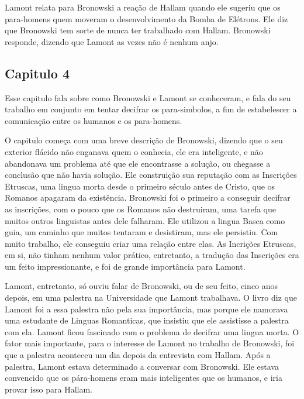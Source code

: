 \documentclass[14pt,portuguese]{extreport}
\begin{document}
	  Lamont relata para Bronowski a reação de Hallam quando ele sugeriu que os para-homens quem 
	  moveram o desenvolvimento da Bomba de Elétrons. Ele diz que Bronowski tem sorte de nunca ter 
	  trabalhado com Hallam. Bronowski responde, dizendo que Lamont as vezes não é nenhum anjo.


	\subsection{Capitulo 4}

	  Esse capitulo fala sobre como Bronowski e Lamont se conheceram, e fala do seu trabalho em 
	  conjunto em tentar decifrar os para-simbolos, a fim de estabelescer a comunicação entre os 
	  humanos e os para-homens.
	
	  O capitulo começa com uma breve descrição de Bronowski, dizendo que o seu exterior flácido 
	  não enganava quem o conhecia, ele era inteligente, e não abandonava um problema até que ele 
	  encontrasse a solução, ou chegasse a conclusão que não havia solução. Ele construição sua 
	  reputação com as Inscrições Etruscas, uma lingua morta desde o primeiro século antes de 
	  Cristo, que os Romanos apagaram da existência. Bronowski foi o primeiro a conseguir decifrar 
	  as inscrições, com o pouco que os Romanos não destruiram, uma tarefa que muitos outros 
	  linguistas antes dele falharam. Ele utilizou a lingua Basca como guia, um caminho que muitos 
	  tentaram e desistiram, mas ele persistiu. Com muito trabalho, ele conseguiu criar uma relação 
	  entre elas. As Incrições Etruscas, em si, não tinham nenhum valor prático, entretanto, a 
	  tradução das Inscrições era um feito impressionante, e foi de grande importância para Lamont.
	
	  Lamont, entretanto, só ouviu falar de Bronowski, ou de seu feito, cinco anos depois, em uma 
	  palestra na Universidade que Lamont trabalhava. O livro diz que Lamont foi a essa palestra 
	  não pela sua importância, mas porque ele namorava uma estudante de Linguas Romanticas, que 
	  insistiu que ele assistisse a palestra com ela. Lamont ficou fascinado com o problema de 
	  decifrar uma lingua morta. O fator mais importante, para o interesse de Lamont no trabalho 
	  de Bronowski, foi que a palestra aconteceu um dia depois da entrevista com Hallam. Após a 
	  palestra, Lamont estava determinado a conversar com Bronowski. Ele estava convencido que os 
	  pára-homens eram mais inteligentes que os humanos, e iria provar isso para Hallam.
	
\end{document}
